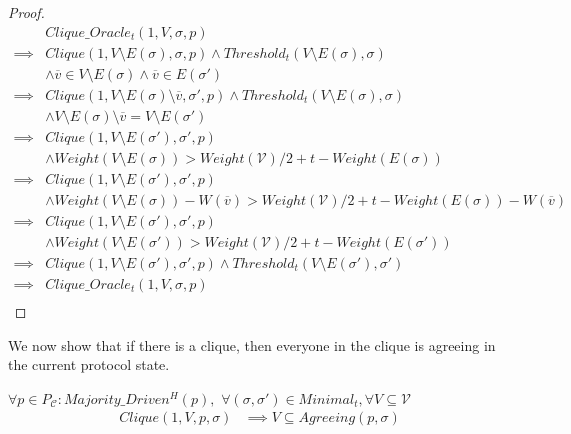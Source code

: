 \begin{proof}
  \begin{align}
    &Clique\_Oracle_t(1, V, \sigma, p) \\
    \implies& Clique(1, V \setminus E(\sigma), \sigma, p) \land Threshold_t(V \setminus E(\sigma), \sigma) \\
            & \land \overline{v} \in V \setminus E(\sigma) \land \overline{v} \in E(\sigma') \\
    \implies& Clique(1, V \setminus E(\sigma) \setminus {\overline{v}}, \sigma', p) \land Threshold_t(V \setminus E(\sigma), \sigma) \\
            & \land V \setminus E(\sigma) \setminus {\overline{v}} = V \setminus E(\sigma') \\
    \implies& Clique(1, V \setminus E(\sigma'), \sigma', p) \\
            & \land Weight(V \setminus E(\sigma)) > Weight(\mathcal{V})/2 + t - Weight(E(\sigma)) \\
    \implies& Clique(1, V \setminus E(\sigma'), \sigma', p) \\
            & \land Weight(V \setminus E(\sigma)) - W(\overline{v}) > Weight(\mathcal{V})/2 + t - Weight(E(\sigma)) - W(\overline{v}) \\
    \implies& Clique(1, V \setminus E(\sigma'), \sigma', p) \\
            & \land Weight(V \setminus E(\sigma')) > Weight(\mathcal{V})/2 + t - Weight(E(\sigma')) \\
    \implies& Clique(1, V \setminus E(\sigma'), \sigma', p) \land Threshold_t(V \setminus E(\sigma'), \sigma')\\
    \implies& Clique\_Oracle_t(1, V, \sigma, p) \\
  \end{align}
\end{proof}

We now show that if there is a clique, then everyone in the clique is agreeing in the current protocol state.
\begin{lemma}
  $\forall p \in P_{\mathcal{C}} : Majority\_Driven^H(p),$ $\forall (\sigma, \sigma') \in Minimal_t, \forall V \subseteq \mathcal{V}$
\begin{align}
Clique(1, V, p, \sigma) &\implies V \subseteq Agreeing(p, \sigma)
\end{align}
\end{lemma}

